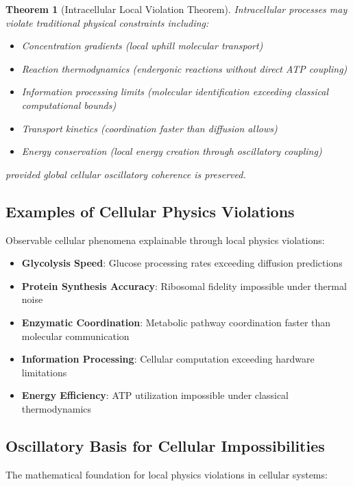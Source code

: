 \documentclass[12pt,a4paper]{article}
\newtheorem{theorem}{Theorem}
\begin{document}
{\begin{theorem}[Intracellular Local Violation Theorem]
Intracellular processes may violate traditional physical constraints including:
\begin{itemize}
\item Concentration gradients (local uphill molecular transport)
\item Reaction thermodynamics (endergonic reactions without direct ATP coupling)
\item Information processing limits (molecular identification exceeding classical computational bounds)
\item Transport kinetics (coordination faster than diffusion allows)
\item Energy conservation (local energy creation through oscillatory coupling)
\end{itemize}
provided global cellular oscillatory coherence is preserved.
\end{theorem}

\subsection{Examples of Cellular Physics Violations}

Observable cellular phenomena explainable through local physics violations:

\begin{itemize}
\item \textbf{Glycolysis Speed}: Glucose processing rates exceeding diffusion predictions
\item \textbf{Protein Synthesis Accuracy}: Ribosomal fidelity impossible under thermal noise
\item \textbf{Enzymatic Coordination}: Metabolic pathway coordination faster than molecular communication
\item \textbf{Information Processing}: Cellular computation exceeding hardware limitations
\item \textbf{Energy Efficiency}: ATP utilization impossible under classical thermodynamics
\end{itemize}

\subsection{Oscillatory Basis for Cellular Impossibilities}

The mathematical foundation for local physics violations in cellular systems:

}
\end{document}
